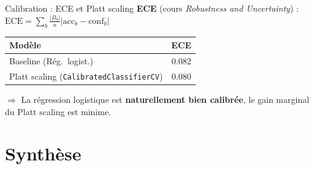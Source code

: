 \documentclass[aspectratio=169, 11pt]{beamer}
\begin{document}
\begin{frame}{Calibration : ECE et Platt scaling}
\textbf{ECE} (cours \textit{Robustness and Uncertainty}) :
$\text{ECE} = \sum_{b} \frac{|B_b|}{n} |\text{acc}_b - \text{conf}_b|$

\vspace{0.5em}
\centering
\begin{tabular}{lc}
\toprule
\textbf{Mod\`ele} & \textbf{ECE} \\
\midrule
Baseline (R\'eg.\ logist.) & 0.082 \\
Platt scaling (\texttt{CalibratedClassifierCV}) & 0.080 \\
\bottomrule
\end{tabular}

\vspace{0.5em}
$\Rightarrow$ La r\'egression logistique est \textbf{naturellement bien calibr\'ee}, le gain marginal du Platt scaling est minime.
\end{frame}

\section{Synth\`ese}
\end{document}
